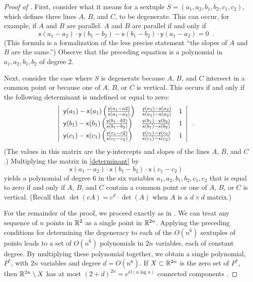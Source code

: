 \documentclass{patmorin}
\newcommand{\x}{\mathsf{x}}
\newcommand{\y}{\mathsf{y}}
\begin{document}
\begin{proof}[Proof of ]
   First, consider what it means for a sextuple
   $S=(a_1,a_2,b_1,b_2,c_1,c_2)$, which defines three lines $A$, $B$,
   and $C$, to be degenerate.  This can occur, for example, if $A$
   and $B$ are parallel.  $A$ and $B$ are parallel if and only if
   \[
      \x(a_1-a_2)\cdot \y(b_1-b_2) - 
       \x(b_1-b_2)\cdot \y(a_1-a_2) = 0 \enspace .
   \]
   (This formula is a formalization of the less precise statement
   ``the slopes of $A$ and $B$ are the same.'')
   Observe that the preceding equation is a polynomial in
   $a_1,a_2,b_1,b_2$ of degree 2.

   Next, consider the case where $S$ is degenerate because $A$, $B$, and
   $C$ intersect in a common point or because one of $A$, $B$, or $C$
   is vertical.  This occurs if and only if the following determinant
   is undefined or equal to zero:
   \begin{equation}
   \left|\begin{array}{lll}
   \y(a_1)-\x(a_1)\left(\frac{\y(a_1-a2)}{\x(a_1-a_2)}\right) & \frac{\y(a_1)-\y(a_2)}{\x(a_1)-\x(a_2)} & 1 \\
   \y(b_1)-\x(b_1)\left(\frac{\y(b_1-b2)}{\x(b_1-b_2)}\right) & \frac{\y(b_1)-\y(b_2)}{\x(b_1)-\x(b_2)}  & 1 \\
   \y(c_1)-\x(c_1)\left(\frac{\y(c_1-c2)}{\x(c_1-c_2)}\right) & \frac{\y(c_1)-\y(c_2)}{\x(c_1)-\x(c_2)}  & 1 \\
   \end{array}\right| \enspace .
   \eqlabel{determinant}
   \end{equation}
   (The values in this matrix are the $\y$-intercepts and slopes of the
   lines $A$, $B$, and $C$.)
   Multiplying the matrix in \eqref{determinant} by 
   \[
      \x(a_1-a_2)\cdot
      \x(b_1-b_2)\cdot
      \x(c_1-c_2)
   \]
   yields a polynomial of degree $6$ in the six variables
   $a_1,a_2,b_1,b_2,c_1,c_2$ that is equal to zero if and only if $A$,
   $B$, and $C$ contain a common point or one of $A$, $B$, or $C$
   is vertical. (Recall that $\det(cA)=c^d\cdot\det(A)$ when $A$ is a
   $d\times d$ matrix.)

   For the remainder of the proof, we proceed exactly as in
   \cite{goodman.pollack:upper}.  We can treat any sequence of $n$ points
   in $\mathbb{R}^2$ as a single point in $\mathbb{R}^{2n}$.  Applying the preceding
   conditions for determining the degeneracy to each of the $O(n^6)$
   sextuples of points leads to a set of $O(n^6)$ polynomials in $2n$
   variables, each of constant degree.  By multiplying these polynomial
   together, we obtain a single polynomial, $P^*$, with $2n$ variables
   and degree $d=O(n^6)$.  If $X\subset\mathbb{R}^{2n}$ is the zero set of $P^*$,
   then $\mathbb{R}^{2n}\setminus X$ has at most $(2+d)^{2n}=e^{O(n\log n)}$
   connected components \cite[Lemma~2]{goodman.pollack:upper}.


\end{proof}
\end{document}
